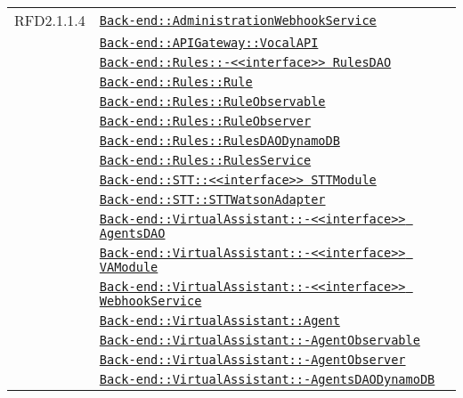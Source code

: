 \begin{longtable}{|>{\centering}m{3cm}|m{10cm}<{\centering}|}
RFD2.1.1.4 & \hyperref[Back-end::AdministrationWebhookService]{\texttt{Back-end::AdministrationWebhookService}}\\
& \hyperref[Back-end::APIGateway::VocalAPI]{\texttt{Back-end::APIGateway::VocalAPI}}\\
& \hyperref[Back-end::Rules::<<interface>> RulesDAO]{\texttt{Back-end::Rules::-\linebreak <<interface>> RulesDAO}}\\
& \hyperref[Back-end::Rules::Rule]{\texttt{Back-end::Rules::Rule}}\\
& \hyperref[Back-end::Rules::RuleObservable]{\texttt{Back-end::Rules::RuleObservable}}\\
& \hyperref[Back-end::Rules::RuleObserver]{\texttt{Back-end::Rules::RuleObserver}}\\
& \hyperref[Back-end::Rules::RulesDAODynamoDB]{\texttt{Back-end::Rules::RulesDAODynamoDB}}\\
& \hyperref[Back-end::Rules::RulesService]{\texttt{Back-end::Rules::RulesService}}\\
& \hyperref[Back-end::STT::<<interface>> STTModule]{\texttt{Back-end::STT::<<interface>> STTModule}}\\
& \hyperref[Back-end::STT::STTWatsonAdapter]{\texttt{Back-end::STT::STTWatsonAdapter}}\\
& \hyperref[Back-end::VirtualAssistant::<<interface>> AgentsDAO]{\texttt{Back-end::VirtualAssistant::-\linebreak <<interface>> AgentsDAO}}\\
& \hyperref[Back-end::VirtualAssistant::<<interface>> VAModule]{\texttt{Back-end::VirtualAssistant::-\linebreak <<interface>> VAModule}}\\
& \hyperref[Back-end::VirtualAssistant::<<interface>> WebhookService]{\texttt{Back-end::VirtualAssistant::-\linebreak <<interface>> WebhookService}}\\
& \hyperref[Back-end::VirtualAssistant::Agent]{\texttt{Back-end::VirtualAssistant::Agent}}\\
& \hyperref[Back-end::VirtualAssistant::AgentObservable]{\texttt{Back-end::VirtualAssistant::-\linebreak AgentObservable}}\\
& \hyperref[Back-end::VirtualAssistant::AgentObserver]{\texttt{Back-end::VirtualAssistant::-\linebreak AgentObserver}}\\
& \hyperref[Back-end::VirtualAssistant::AgentsDAODynamoDB]{\texttt{Back-end::VirtualAssistant::-\linebreak AgentsDAODynamoDB}}\\

\end{longtable}
